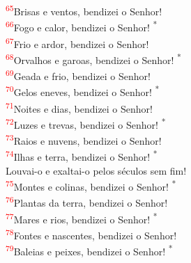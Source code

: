 \documentclass{book}
\begin{document}
\begin{center}
    \textsuperscript{\textcolor{red}{65}}Brisas e ventos, bendizei o Senhor! \\
    \textsuperscript{\underline{\hspace{.06in}}\textcolor{red}{66}}Fogo e calor, bendizei o Senhor! \textsuperscript{*} \\
    \textsuperscript{\textcolor{red}{67}}Frio e ardor, bendizei o Senhor!
    \vspace{.2cm} \\
    \textsuperscript{\underline{\hspace{.06in}}\textcolor{red}{68}}Orvalhos e garoas, bendizei o Senhor! \textsuperscript{*} \\
    \textsuperscript{\textcolor{red}{69}}Geada e frio, bendizei o Senhor! \\
    \textsuperscript{\underline{\hspace{.06in}}\textcolor{red}{70}}Gelos eneves, bendizei o Senhor! \textsuperscript{*} \\
    \textsuperscript{\textcolor{red}{71}}Noites e dias, bendizei o Senhor!
    \vspace{.2cm} \\
    \textsuperscript{\underline{\hspace{.06in}}\textcolor{red}{72}}Luzes e trevas, bendizei o Senhor! \textsuperscript{*} \\
    \textsuperscript{\textcolor{red}{73}}Raios e nuvens, bendizei o Senhor! \\
    \textsuperscript{\underline{\hspace{.06in}}\textcolor{red}{74}}Ilhas e terra, bendizei o Senhor! \textsuperscript{*} \\
    Louvai-o e exaltai-o pelos séculos sem fim!
    \vspace{.2cm} \\
    \textsuperscript{\underline{\hspace{.06in}}\textcolor{red}{75}}Montes e colinas, bendizei o Senhor! \textsuperscript{*} \\
    \textsuperscript{\textcolor{red}{76}}Plantas da terra, bendizei o Senhor! \\
    \textsuperscript{\underline{\hspace{.06in}}\textcolor{red}{77}}Mares e rios, bendizei o Senhor! \textsuperscript{*} \\
    \textsuperscript{\textcolor{red}{78}}Fontes e nascentes, bendizei o Senhor!
    \vspace{.2cm} \\
    \textsuperscript{\underline{\hspace{.06in}}\textcolor{red}{79}}Baleias e peixes, bendizei o Senhor! \textsuperscript{*} \\

\end{center}
\end{document}
